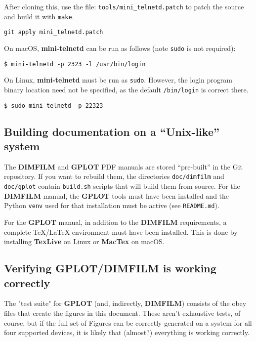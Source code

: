 \documentclass[a4paper,twoside,11pt]{article}
\newcommand{\newpara}{\par\vspace{4mm}\noindent}
\begin{document}
\newpara
After cloning this, use the file: \texttt{tools/mini\_telnetd.patch} to patch the source and build it with \texttt{make}.
\begin{lstlisting}
git apply mini_telnetd.patch
\end{lstlisting}

\newpara
On macOS, \textbf{mini-telnetd} can be run as follows (note \texttt{sudo} is not required):
\begin{lstlisting}
$ mini-telnetd -p 2323 -l /usr/bin/login
\end{lstlisting}

\newpara
On Linux, \textbf{mini-telnetd} must be run as \texttt{sudo}. However, the login program binary location need not be specified,
as the default \texttt{/bin/login} is correct there.
\begin{lstlisting}
$ sudo mini-telnetd -p 22323 
\end{lstlisting}

\subsection{Building documentation on a ``Unix-like'' system}
\newpara
The \textbf{DIMFILM} and \textbf{GPLOT} PDF manuals are stored ``pre-built'' in the Git repository. If you want to rebuild them,
the directories \texttt{doc/dimfilm} and \texttt{doc/gplot} contain \texttt{build.sh} scripts that will build them from source. For
the \textbf{DIMFILM} manual, the \textbf{GPLOT} tools must have been installed and
the Python \texttt{venv} used for that installation must be active
(see \texttt{README.md}).

\newpara
For the \textbf{GPLOT} manual, in addition to the \textbf{DIMFILM} requirements, a complete TeX/LaTeX environment
must have been installed. This is done by installing \textbf{TexLive} on Linux or \textbf{MacTex} on macOS.

\subsection{Verifying GPLOT/DIMFILM is working correctly}

The "test suite" for \textbf{GPLOT} (and, indirectly, \textbf{DIMFILM}) consists of the obey files that
create the figures in this document. These aren't exhaustive tests, of course, but
if the full set of Figures can be correctly generated on a system for all four
supported devices, it is likely that (almost?) everything is working correctly.
\end{document}
